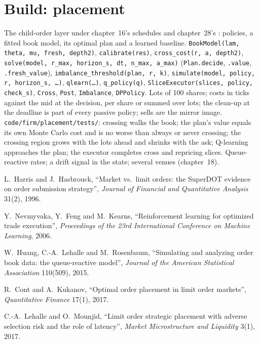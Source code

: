 \section{Build: placement}\label{bld:mx:child-order-placement:placement}

\begin{build}
 The child-order layer under chapter~16's schedules and chapter~28's : policies, a fitted book model, its optimal
plan and a learned baseline.
 \texttt{BookModel(lam, theta, mu, fresh, depth2)}, \texttt{calibrate(res)}, \texttt{cross\_cost(r, a, depth2)},
\texttt{solve(model, r\_max, horizon\_s, dt, n\_max, a\_max)} (\texttt{Plan.decide}, \texttt{.value}, \texttt{.fresh\_value}),
\texttt{imbalance\_threshold(plan, r, k)}, \texttt{simulate(model, policy, r, horizon\_s, \dots)}, \texttt{qlearn(\dots)}, \texttt{q\_policy(q)},
\texttt{SliceExecutor(slices, policy, check\_s)}, \texttt{Cross}, \texttt{Post}, \texttt{Imbalance}, \texttt{DPPolicy}.
 Lots of 100 shares; costs in ticks against the mid at the decision, per share or summed over lots; the clean-up at the deadline is
part of every passive policy; sells are the mirror image.
 \texttt{code/firm/placement/tests/}: crossing walks the book; the plan's value equals its own Monte Carlo cost and is no worse
than always or never crossing; the crossing region grows with the lots ahead and shrinks with the ask; Q-learning approaches the plan; the executor
completes cross and repricing slices.
 Queue-reactive rates; a drift signal in the state; several venues (chapter~18).
\end{build}

\begin{omsources}
\item L.~Harris and J.~Hasbrouck, ``Market vs.\ limit orders: the SuperDOT evidence on order submission strategy'', \emph{Journal of Financial and
Quantitative Analysis} 31(2), 1996.
\item Y.~Nevmyvaka, Y.~Feng and M.~Kearns, ``Reinforcement learning for optimized trade execution'', \emph{Proceedings of the 23rd International
Conference on Machine Learning}, 2006.
\item W.~Huang, C.-A.~Lehalle and M.~Rosenbaum, ``Simulating and analyzing order book data: the queue-reactive model'', \emph{Journal of the American
Statistical Association} 110(509), 2015.
\item R.~Cont and A.~Kukanov, ``Optimal order placement in limit order markets'', \emph{Quantitative Finance} 17(1), 2017.
\item C.-A.~Lehalle and O.~Mounjid, ``Limit order strategic placement with adverse selection risk and the role of latency'', \emph{Market
Microstructure and Liquidity} 3(1), 2017.
\end{omsources}

